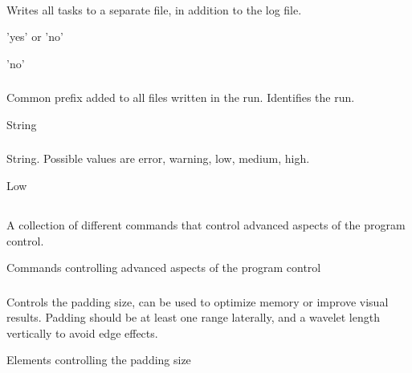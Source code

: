 \paragraph{}
 \slist
   \item \Description Writes all tasks to a separate file, in
   addition to the log file.
   \item \Argument 'yes' or 'no'
   \item \Default 'no'
\elist

\subsubsection{}
 \slist
   \item \Description Common prefix added to all files written in the run. Identifies the run.
   \item \Argument String
   \item \Default
 \elist

\subsubsection{}
 \slist
   \item \Description
   \item \Argument String. Possible values are error, warning, low, medium, high.
   \item \Default Low
 \elist

\subsection{} 
 \slist
   \item \Description A collection of different commands that control advanced aspects of the program control.
   \item \Argument Commands controlling advanced aspects of the program control
   \item \Default
 \elist

\subsubsection{}
 \slist
   \item \Description Controls the padding size, can be used to optimize memory or improve visual results. Padding should be at least one range laterally, and a wavelet length vertically to avoid edge effects.
   \item \Argument Elements controlling the padding size
   \item \Default
 \elist

